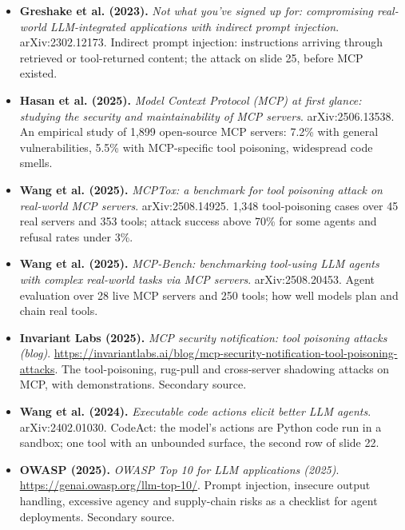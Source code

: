 \documentclass[11pt,letterpaper]{article}
\begin{document}
\begin{itemize}[leftmargin=1.2em,itemsep=3pt]
\item \textbf{Greshake et al. (2023).} \textit{Not what you've signed up for: compromising real-world LLM-integrated applications with indirect prompt injection}. arXiv:2302.12173. Indirect prompt injection: instructions arriving through retrieved or tool-returned content; the attack on slide 25, before MCP existed.
\item \textbf{Hasan et al. (2025).} \textit{Model Context Protocol (MCP) at first glance: studying the security and maintainability of MCP servers}. arXiv:2506.13538. An empirical study of 1,899 open-source MCP servers: 7.2\% with general vulnerabilities, 5.5\% with MCP-specific tool poisoning, widespread code smells.
\item \textbf{Wang et al. (2025).} \textit{MCPTox: a benchmark for tool poisoning attack on real-world MCP servers}. arXiv:2508.14925. 1,348 tool-poisoning cases over 45 real servers and 353 tools; attack success above 70\% for some agents and refusal rates under 3\%.
\item \textbf{Wang et al. (2025).} \textit{MCP-Bench: benchmarking tool-using LLM agents with complex real-world tasks via MCP servers}. arXiv:2508.20453. Agent evaluation over 28 live MCP servers and 250 tools; how well models plan and chain real tools.
\item \textbf{Invariant Labs (2025).} \textit{MCP security notification: tool poisoning attacks (blog)}. \url{https://invariantlabs.ai/blog/mcp-security-notification-tool-poisoning-attacks}. The tool-poisoning, rug-pull and cross-server shadowing attacks on MCP, with demonstrations. Secondary source.
\item \textbf{Wang et al. (2024).} \textit{Executable code actions elicit better LLM agents}. arXiv:2402.01030. CodeAct: the model's actions are Python code run in a sandbox; one tool with an unbounded surface, the second row of slide 22.
\item \textbf{OWASP (2025).} \textit{OWASP Top 10 for LLM applications (2025)}. \url{https://genai.owasp.org/llm-top-10/}. Prompt injection, insecure output handling, excessive agency and supply-chain risks as a checklist for agent deployments. Secondary source.
\end{itemize}
\end{document}

